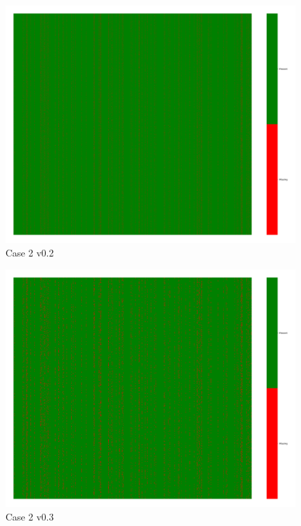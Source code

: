 \documentclass[a4paper,12pt]{article}
\begin{document}
\begin{figure}[H]
    \includegraphics[width=\linewidth]{case2_v0.2_heatmap_cleaned.png}
    \caption*{Case 2 v0.2}
\end{figure}

\begin{figure}[H]
    \includegraphics[width=\linewidth]{case2_v0.3_heatmap_cleaned.png}
    \caption*{Case 2 v0.3}
\end{figure}
\end{document}
